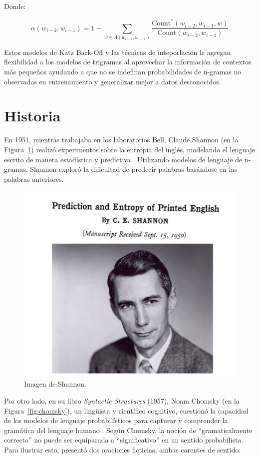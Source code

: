 Donde:

\[
\alpha(w_{i-2}, w_{i-1}) = 1 - \sum_{w \in A(w_{i-2}, w_{i-1})} \frac{\text{Count}^*(w_{i-2}, w_{i-1}, w)}{\text{Count}(w_{i-2}, w_{i-1})}
\]

Estos modelos de Katz Back-Off y las técnicas de inteporlación le agregan flexibilidad a los modelos de trigramas al aprovechar la información de contextos más pequeños ayudando a que no se indefinan probabilidades de n-gramas no observadas en entrenamiento y generalizar mejor a datos desconocidos. 

\section{Historia}
En 1951, mientras trabajaba en los laboratorios Bell, Claude Shannon (en la Figura~\ref{fig:shannon}) realizó experimentos sobre la entropía del inglés, modelando el lenguaje escrito de manera estadística y predictiva \cite{shannon1951prediction}. Utilizando modelos de lenguaje de n-gramas, Shannon exploró la dificultad de predecir palabras basándose en las palabras anteriores.

\begin{figure}[h]
    \centering
    \includegraphics[scale = 0.4]{pics/shannon.png}
    \caption{Imagen de Shannon.}
    \label{fig:shannon}
\end{figure}

Por otro lado, en su libro \textit{Syntactic Structures} (1957), Noam Chomsky (en la Figura~\ref{fig:chomsky}), un lingüista y científico cognitivo, cuestionó la capacidad de los modelos de lenguaje probabilísticos para capturar y comprender la gramática del lenguaje humano \cite{chomsky2009syntactic}. Según Chomsky, la noción de ``gramaticalmente correcto'' no puede ser equiparada a ``significativo'' en un sentido probabilista. Para ilustrar esto, presentó dos oraciones ficticias, ambas carentes de sentido:

